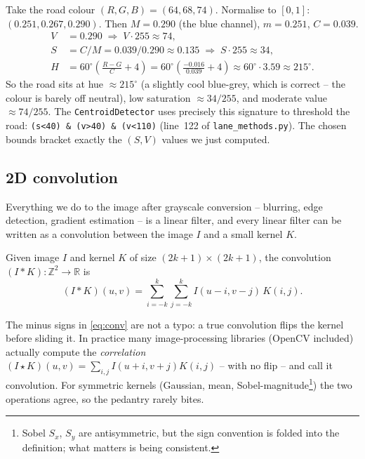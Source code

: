 \begin{example}
Take the road colour $(R,G,B)=(64,68,74)$. Normalise to $[0,1]$:
$(0.251,0.267,0.290)$. Then $M=0.290$ (the blue channel), $m=0.251$,
$C=0.039$.
\begin{align*}
V &= 0.290 \;\Rightarrow\; V\cdot 255 \approx 74,\\
S &= C/M = 0.039/0.290 \approx 0.135 \;\Rightarrow\; S\cdot 255 \approx 34,\\
H &= 60^\circ\!\left(\tfrac{R-G}{C}+4\right)
   = 60^\circ\!\left(\tfrac{-0.016}{0.039}+4\right)
   \approx 60^\circ\cdot 3.59 \approx 215^\circ.
\end{align*}
So the road sits at hue $\approx 215^\circ$ (a slightly cool
blue-grey, which is correct -- the colour is barely off neutral), low
saturation $\approx 34/255$, and moderate value $\approx 74/255$. The
\texttt{CentroidDetector} uses precisely this signature to threshold
the road: \texttt{(s<40) \& (v>40) \& (v<110)} (line~122 of
\texttt{lane\_methods.py}). The chosen bounds bracket exactly the
$(S,V)$ values we just computed.
\end{example}

\subsection{2D convolution}

Everything we do to the image after grayscale conversion -- blurring,
edge detection, gradient estimation -- is a linear filter, and every
linear filter can be written as a convolution between the image $I$
and a small kernel $K$.

\begin{definition}
Given image $I$ and kernel $K$ of size $(2k{+}1)\times(2k{+}1)$, the
convolution $(I*K):\mathbb{Z}^2\to\mathbb{R}$ is
\begin{equation}
(I*K)(u,v) = \sum_{i=-k}^{k}\sum_{j=-k}^{k}
            I(u-i,v-j)\,K(i,j).
\label{eq:conv}
\end{equation}
\end{definition}

The minus signs in \eqref{eq:conv} are not a typo: a true convolution
flips the kernel before sliding it. In practice many image-processing
libraries (OpenCV included) actually compute the \emph{correlation}
$(I\star K)(u,v) = \sum_{i,j} I(u+i,v+j)K(i,j)$ -- with no flip -- and
call it convolution. For symmetric kernels (Gaussian, mean,
Sobel-magnitude\footnote{Sobel $S_x$, $S_y$ are antisymmetric, but the
sign convention is folded into the definition; what matters is being
consistent.}) the two operations agree, so the pedantry rarely bites.


